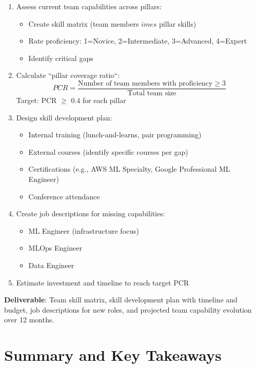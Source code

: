 \begin{enumerate}
    \item Assess current team capabilities across pillars:
        \begin{itemize}
            \item Create skill matrix (team members $	imes$ pillar skills)
            \item Rate proficiency: 1=Novice, 2=Intermediate, 3=Advanced, 4=Expert
            \item Identify critical gaps
        \end{itemize}
    \item Calculate ``pillar coverage ratio``:
        \begin{equation*}
        PCR = \frac{\text{Number of team members with proficiency} \geq 3}{\text{Total team size}}
        \end{equation*}
        Target: PCR $\geq$ 0.4 for each pillar
    \item Design skill development plan:
        \begin{itemize}
            \item Internal training (lunch-and-learns, pair programming)
            \item External courses (identify specific courses per gap)
            \item Certifications (e.g., AWS ML Specialty, Google Professional ML Engineer)
            \item Conference attendance
        \end{itemize}
    \item Create job descriptions for missing capabilities:
        \begin{itemize}
            \item ML Engineer (infrastructure focus)
            \item MLOps Engineer
            \item Data Engineer
        \end{itemize}
    \item Estimate investment and timeline to reach target PCR
\end{enumerate}

\textbf{Deliverable}: Team skill matrix, skill development plan with timeline and budget, job descriptions for new roles, and projected team capability evolution over 12 months.

\section{Summary and Key Takeaways}

